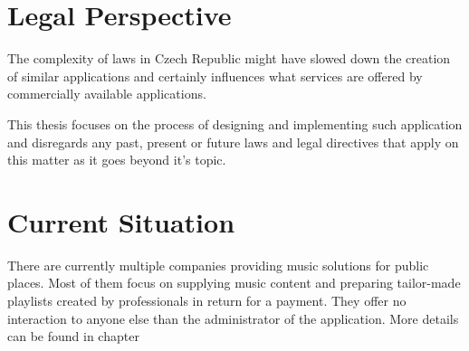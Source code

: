 \section*{Legal Perspective}

The complexity of laws in Czech Republic might have slowed down the creation of similar applications and certainly influences what services are offered by commercially available applications.
\par
This thesis focuses on the process of designing and implementing such application and disregards any past, present or future laws and legal directives that apply on this matter as it goes beyond it's topic.

\section*{Current Situation}

There are currently multiple companies providing music solutions for public places. Most of them focus on supplying music content and preparing tailor-made playlists created by professionals in return for a payment. They offer no interaction to anyone else than the administrator of the application. More details can be found in chapter 






